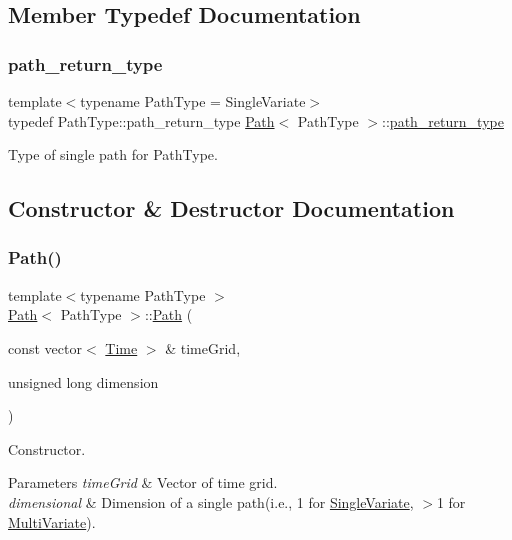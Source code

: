 \subsection{Member Typedef Documentation}
\hypertarget{class_path_a3b1c34a87f7867f6fed2e0a33f801e7d}{}\label{class_path_a3b1c34a87f7867f6fed2e0a33f801e7d} 
\subsubsection{\texorpdfstring{path\+\_\+return\+\_\+type}{path\_return\_type}}
{\footnotesize\ttfamily template$<$typename Path\+Type = Single\+Variate$>$ \\
typedef Path\+Type\+::path\+\_\+return\+\_\+type \hyperlink{class_path}{Path}$<$ Path\+Type $>$\+::\hyperlink{class_path_a3b1c34a87f7867f6fed2e0a33f801e7d}{path\+\_\+return\+\_\+type}}



Type of single path for Path\+Type. 



\subsection{Constructor \& Destructor Documentation}
\hypertarget{class_path_ab0fff5e8514331bba55ab5745fc485a4}{}\label{class_path_ab0fff5e8514331bba55ab5745fc485a4} 
\subsubsection{\texorpdfstring{Path()}{Path()}\hspace{0.1cm}{\footnotesize\ttfamily [1/2]}}
{\footnotesize\ttfamily template$<$typename Path\+Type $>$ \\
\hyperlink{class_path}{Path}$<$ Path\+Type $>$\+::\hyperlink{class_path}{Path} (\begin{DoxyParamCaption}\item[{const vector$<$ \hyperlink{_name_def_8h_ac2d3e0ba793497bcca555c7c2cf64ff3}{Time} $>$ \&}]{time\+Grid,  }\item[{unsigned long}]{dimension }\end{DoxyParamCaption})}



Constructor. 


\begin{DoxyParams}{Parameters}
{\em time\+Grid} & Vector of time grid. \\
\hline
{\em dimensional} & Dimension of a single path(i.\+e., 1 for \hyperlink{struct_single_variate}{Single\+Variate}, $>$1 for \hyperlink{struct_multi_variate}{Multi\+Variate}). \\
\hline
\end{DoxyParams}
\hypertarget{class_path_a8437fecb95fe145057c957feb8b8955a}{}\label{class_path_a8437fecb95fe145057c957feb8b8955a} 
